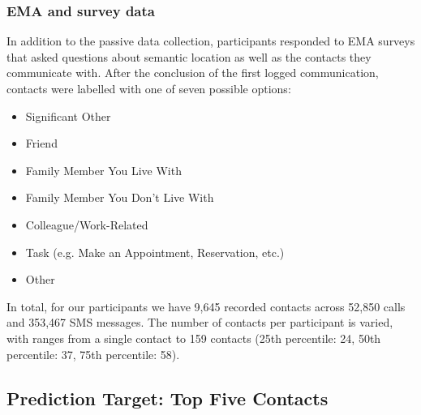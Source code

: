 \documentclass[acmlarge]{acmart}
\begin{document}
\subsubsection*{EMA and survey data}
In addition to the passive data collection, participants responded to EMA surveys that asked questions about semantic location as well as the contacts they communicate with. After the conclusion of the first logged communication, contacts were labelled with one of seven possible options:

\begin{itemize}
    \itemsep0em 
    \item Significant Other
    \item Friend
    \item Family Member You Live With
    \item Family Member You Don't Live With 
    \item Colleague/Work-Related
    \item Task (e.g. Make an Appointment, Reservation, etc.)
    \item Other
\end{itemize}



In total, for our participants we have 9,645 recorded contacts across 52,850 calls and 353,467 SMS messages. 
The number of contacts per participant is varied, with ranges from a single contact to 159 contacts (25th percentile: 24, 50th percentile: 37, 75th percentile: 58).

\subsection{Prediction Target: Top Five Contacts}
\label{subsec:target_categories}
\end{document}
